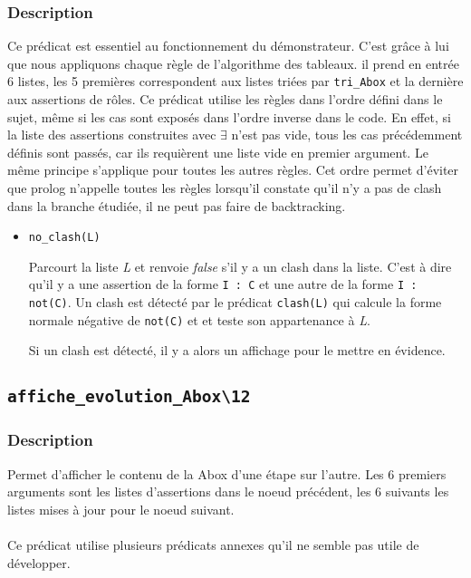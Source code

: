 \documentclass{article}
\newcommand{\code}[1]{\colorbox{light-gray}{\texttt{#1}}}
\begin{document}
\subsubsection{Description}

Ce prédicat est essentiel au fonctionnement du démonstrateur. C'est grâce à lui que nous appliquons chaque règle de l'algorithme des tableaux. il prend en entrée 6 listes, les 5 premières correspondent aux listes triées par \code{tri\_Abox} et la dernière aux assertions de rôles. Ce prédicat utilise les règles dans l'ordre défini dans le sujet, même si les cas sont exposés dans l'ordre inverse dans le code. En effet, si la liste des assertions construites avec $\exists$ n'est pas vide, tous les cas précédemment définis sont passés, car ils requièrent une liste vide en premier argument. Le même principe s'applique pour toutes les autres règles. Cet ordre permet d'éviter que prolog n'appelle toutes les règles lorsqu'il constate qu'il n'y a pas de clash dans la branche étudiée, il ne peut pas faire de backtracking.

\begin{itemize}
    \item \code{no\_clash(L)}

    Parcourt la liste \textit{L} et renvoie \textit{false} s'il y a un clash dans la liste. C'est à dire qu'il y a une assertion de la forme \code{I : C} et une autre de la forme \code{I :  not(C)}. Un clash est détecté par le prédicat \code{clash(L)} qui calcule la forme normale négative de \code{not(C)} et et teste son appartenance à \textit{L}. 

    Si un clash est détecté, il y a alors un affichage pour le mettre en évidence.
\end{itemize}

\subsection{\code{affiche\_evolution\_Abox\textbackslash12}}

\subsubsection{Description}

Permet d'afficher le contenu de la Abox d'une étape sur l'autre. Les 6 premiers arguments sont les listes d'assertions dans le noeud précédent, les 6 suivants les listes mises à jour pour le noeud suivant.
\\\\
Ce prédicat utilise plusieurs prédicats annexes qu'il ne semble pas utile de développer.
\end{document}
